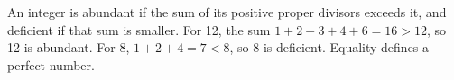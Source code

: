 An integer is abundant if the sum of its positive proper divisors exceeds it, and deficient if that sum is smaller. For 12, the sum $1+2+3+4+6=16>12$, so 12 is abundant. For 8, $1+2+4=7<8$, so 8 is deficient. Equality defines a perfect number.
